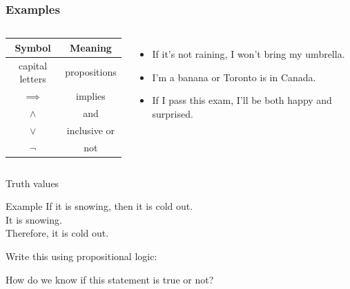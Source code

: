 \documentclass [aspectratio=169]{beamer}
\begin{document}
\begin{frame}\frametitle{Examples}
    \begin{columns}
        \begin{center}
          \begin{tabular}{|c|c|}
\hline
    Symbol & Meaning  \\
    \hline
     capital letters & propositions  \\
     $\implies$ & implies \\
     $\wedge$ & and \\
     $\vee$ & inclusive or \\
     $\neg$ & not \\
     \hline
\end{tabular}
\end{center}
          \begin{itemize}
          \setlength\itemsep{1em}
              \item If it's not raining, I won't bring my umbrella.
              \item I'm a banana or Toronto is in Canada.
              \item If I pass this exam, I'll be both happy and surprised.
          \end{itemize}
      \end{columns}
\end{frame}

\begin{frame}{Truth values}

\begin{exampleblock}{Example}
If it is snowing, then it is cold out. \\
It is snowing. \\
Therefore, it is cold out.  
\end{exampleblock}

Write this using propositional logic: \\

\vspace{4em}

\vspace{1em}
How do we know if this statement is true or not?
\end{frame}
\end{document}
